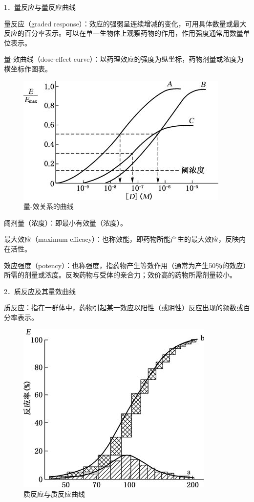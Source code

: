1．量反应与量反应曲线

量反应（graded
response）：效应的强弱呈连续增减的变化，可用具体数量或最大反应的百分率表示。可以在单一生物体上观察药物的作用，作用强度通常用数量单位表示。

量-效曲线（dose-effect
curve）：以药理效应的强度为纵坐标，药物剂量或浓度为横坐标作图表。

\begin{figure}[!htbp]
 \centering
 \includegraphics{./images/Image00005.jpg}
 \captionsetup{justification=centering}
 \caption{量-效关系的曲线}
 \label{fig2-2}
  \end{figure} 

阈剂量（浓度）：即最小有效量（浓度）。

最大效应（maximum
efficacy）：也称效能，即药物所能产生的最大效应，反映内在活性。

效应强度（potency）：也称强度，指药物产生等效作用（通常为产生50％的效应）所需的剂量或浓度。反映药物与受体的亲合力；效价高的药物所需剂量较小。

2．质反应及其量效曲线

质反应：指在一群体中，药物引起某一效应以阳性（或阴性）反应出现的频数或百分率表示。

\begin{figure}[!htbp]
 \centering
 \includegraphics{./images/Image00006.jpg}
 \captionsetup{justification=centering}
 \caption{质反应与质反应曲线}
 \label{fig2-3}
  \end{figure} 


